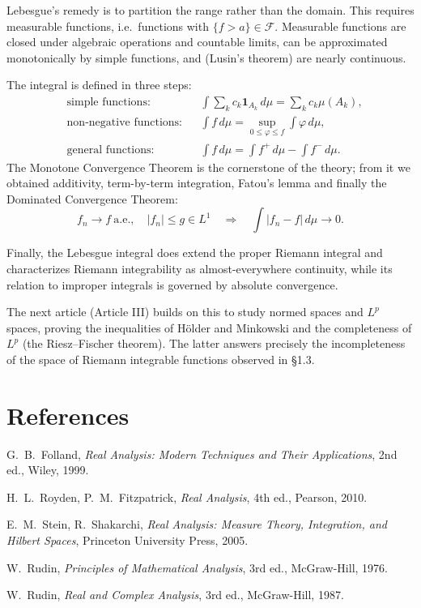 \documentclass[11pt]{article}
\begin{document}
Lebesgue's remedy is to partition the range rather than the domain. This requires measurable functions, i.e.\ functions with $\{f>a\}\in\mathcal{F}$. Measurable functions are closed under algebraic operations and countable limits, can be approximated monotonically by simple functions, and (Lusin's theorem) are nearly continuous.

The integral is defined in three steps:
\begin{align*}
&\text{simple functions:}&&\int\sum_{k}c_{k}\mathbf{1}_{A_{k}}\,d\mu=\sum_{k}c_{k}\mu(A_{k}),\\
&\text{non-negative functions:}&&\int f\,d\mu=\sup_{0\leq\varphi\leq f}\int\varphi\,d\mu,\\
&\text{general functions:}&&\int f\,d\mu=\int f^{+}\,d\mu-\int f^{-}\,d\mu.
\end{align*}
The Monotone Convergence Theorem is the cornerstone of the theory; from it we obtained additivity, term-by-term integration, Fatou's lemma and finally the Dominated Convergence Theorem:
\[
f_{n}\to f\ \text{a.e.},\quad|f_{n}|\leq g\in L^{1}\quad\Longrightarrow\quad\int|f_{n}-f|\,d\mu\to0.
\]

Finally, the Lebesgue integral does extend the proper Riemann integral and characterizes Riemann integrability as almost-everywhere continuity, while its relation to improper integrals is governed by absolute convergence.

The next article (Article III) builds on this to study normed spaces and $L^{p}$ spaces, proving the inequalities of Hölder and Minkowski and the completeness of $L^{p}$ (the Riesz--Fischer theorem). The latter answers precisely the incompleteness of the space of Riemann integrable functions observed in \S1.3.

\section*{References}

\begin{enumerate}[label={[\arabic*]}]
  \item G.~B.~Folland, \textit{Real Analysis: Modern Techniques and Their Applications}, 2nd ed., Wiley, 1999.
  \item H.~L.~Royden, P.~M.~Fitzpatrick, \textit{Real Analysis}, 4th ed., Pearson, 2010.
  \item E.~M.~Stein, R.~Shakarchi, \textit{Real Analysis: Measure Theory, Integration, and Hilbert Spaces}, Princeton University Press, 2005.
  \item W.~Rudin, \textit{Principles of Mathematical Analysis}, 3rd ed., McGraw-Hill, 1976.
  \item W.~Rudin, \textit{Real and Complex Analysis}, 3rd ed., McGraw-Hill, 1987.
\end{enumerate}
\end{document}
